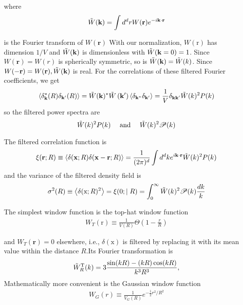 \begin{appendices}
where
\begin{align}
    \Tilde{W}(\mathbf{k})=\int d^d r W(\mathbf{r}) e^{-i \mathbf{k} \cdot \mathbf{r}}
\end{align}

is the Fourier transform of $W(\mathbf{r})$ With our normalization, $W(\mathrm{r})$ has dimension $1 / V$ and $\Tilde{W}(\mathbf{k})$ is dimensionless with $\Tilde{W}(\mathbf{k}=0)=1$. Since $W(\mathbf{r})=W(r)$ is spherically symmetric, so is $\Tilde{W}(\mathbf{k})= \Tilde{W}(k)$. Since $W(-\mathbf{r})=W(\mathbf{r}), \Tilde{W}(\mathbf{k})$ is real.
For the correlations of these filtered Fourier coefficients, we get
\begin{align}
    \left\langle\delta_{\mathbf{k}}^*(R) \delta_{\mathbf{k}^{\prime}}(R)\right\rangle=\Tilde{W}(\mathbf{k})^* \Tilde{W}\left(\mathbf{k}^{\prime}\right)\left\langle\delta_{\mathbf{k}^*} \delta_{\mathbf{k}^{\prime}}\right\rangle=\frac{1}{V} \delta_{\mathbf{k k}^{\prime}} \Tilde{W}(k)^2 P(k)
\end{align}
so the filtered power spectra are
\begin{align}
    \Tilde{W}(k)^2 P(k) \quad \text { and } \quad \Tilde{W}(k)^2 \mathcal{P}(k)
\end{align}

The filtered correlation function is
\begin{align}
    \xi(\mathbf{r} ; R) \equiv\langle\delta(\mathbf{x} ; R) \delta(\mathbf{x}-\mathbf{r} ; R)\rangle=\frac{1}{(2 \pi)^d} \int d^d k e^{i \mathbf{k} \cdot \mathbf{r}}  \Tilde{W}(k)^2 P(k)
\end{align}
and the variance of the filtered density field is
\begin{align}
    \sigma^2(R) \equiv\left\langle\delta(\mathrm{x} ; R)^2\right\rangle=\xi(0 ; \mid R)=\int_0^{\infty}  \Tilde{W}(k)^2 \mathcal{P}(k) \frac{d k}{k}
\end{align}

The simplest window function is the top-hat window function
\begin{align}
    W_T(\mathrm{r}) \equiv \frac{1}{V(R)} \Theta\left(1-\frac{r}{R}\right)\label{c10}
\end{align}

and $W_T(\mathbf{r})=0$ elsewhere, i.e., $\delta(\mathrm{x})$ is filtered by replacing it with its mean value within the distance $R$.Its Fourier transformation is
\begin{align}
      \Tilde{W}_{R}^{\text {T}}(k)=3 \frac{\sin (k R)-(k R) \cos (k R)}{k^{3} R^{3}},
\end{align}
Mathematically more convenient is the Gaussian window function
\begin{align}
    W_G(r) \equiv \frac{1}{V_G(R)} e^{-\frac{1}{2} r^2 / R^2}\label{c11}
\end{align}


\end{appendices}
